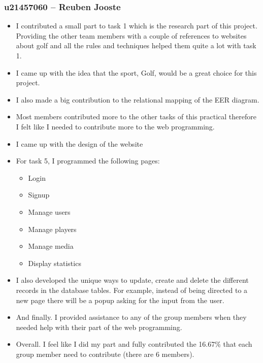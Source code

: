\documentclass[titlepage]{article}
\begin{document}
\subsubsection*{u21457060 – Reuben Jooste}
\vspace{1em}
\begin{itemize}
  \item I contributed a small part to task 1 which is the research part of this project. Providing the other team members
        with a couple of references to websites about golf and all the rules and techniques helped them quite a lot with task 1.
  \item I came up with the idea that the sport, Golf, would be a great choice for this project.
  \item I also made a big contribution to the relational mapping of the EER diagram.
  \item Most members contributed more to the other tasks of this practical therefore I felt like I needed to contribute
        more to the web programming.
  \item I came up with the design of the website
  \item For task 5, I programmed the following pages:
  \begin{itemize}
    \item Login 
    \item Signup 
    \item Manage users
    \item Manage players
    \item Manage media
    \item Display statistics
  \end{itemize}
  \item I also developed the unique ways to update, create and delete the different records in the database tables. 
        For example, instead of being directed to a new page there will be a popup asking for the input from the user.
  \item And finally. I provided assistance to any of the group members when they needed help with their part of the
        web programming.
  \item Overall. I feel like I did my part and fully contributed the 16.67\% that each group member need to contribute (there are 6 members).
\end{itemize}

\vspace{1em}
\end{document}
